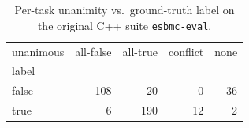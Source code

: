 \begin{table}[t]
  \centering
  \caption{Per-task unanimity vs.\ ground-truth label on the original C++ suite \texttt{esbmc-eval}.}
  \label{tab:unanimous-esbmc-eval}
\begin{tabular}{lrrrr}
\toprule
unanimous & all-false & all-true & conflict & none \\
label &  &  &  &  \\
\midrule
false & 108 & 20 & 0 & 36 \\
true & 6 & 190 & 12 & 2 \\
\bottomrule
\end{tabular}
\end{table}
